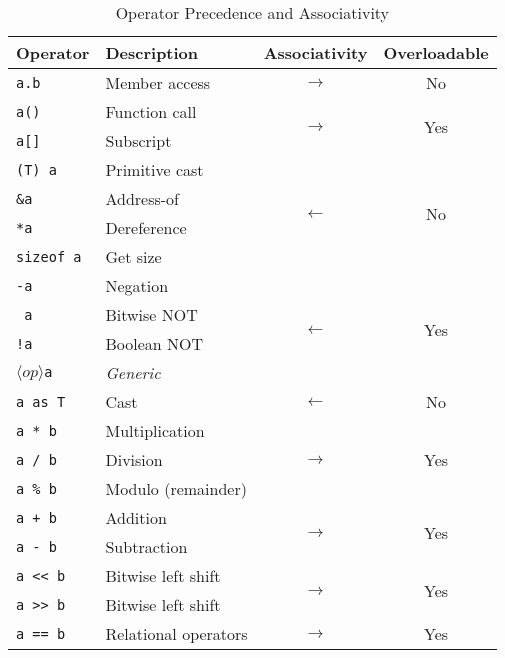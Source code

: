 \begin{table}[h]
    \centering
    \caption{Operator Precedence and Associativity}
    \begin{tabular}{|l|l|c|c|}
        \hline
        \textbf{Operator} & \textbf{Description} & \textbf{Associativity} & \textbf{Overloadable} \\
        \hline
        \texttt{a.b} & Member access & \(\longrightarrow\) & No \\
        \hline
        \texttt{a()} & Function call & \multirow{2}{*}{\(\longrightarrow\)} & \multirow{2}{*}{Yes} \\
        \texttt{a[]} & Subscript & & \\
        \hline
        \texttt{(T) a} & Primitive cast & \multirow{4}{*}{\(\longleftarrow\)} & \multirow{4}{*}{No} \\
        \texttt{\&a} & Address-of & & \\
        \texttt{*a} & Dereference & & \\
        \texttt{sizeof a} & Get size & & \\
        \hline
        \texttt{-a} & Negation & \multirow{4}{*}{\(\longleftarrow\)} & \multirow{4}{*}{Yes} \\
        \texttt{~a} & Bitwise NOT & & \\
        \texttt{!a} & Boolean NOT & & \\
        \(\langle op \rangle\)\texttt{a} & \textit{Generic} & & \\
        \hline
        \texttt{a as T} & Cast & \(\longleftarrow\) & No \\
        \hline
        \texttt{a * b} & Multiplication & \multirow{3}{*}{\(\longrightarrow\)} & \multirow{3}{*}{Yes} \\
        \texttt{a / b} & Division & & \\
        \texttt{a \% b} & Modulo (remainder) & & \\
        \hline
        \texttt{a + b} & Addition & \multirow{2}{*}{\(\longrightarrow\)} & \multirow{2}{*}{Yes} \\
        \texttt{a - b} & Subtraction & & \\
        \hline
        \texttt{a << b} & Bitwise left shift & \multirow{2}{*}{\(\longrightarrow\)} & \multirow{2}{*}{Yes} \\
        \texttt{a >> b} & Bitwise left shift & & \\
        \hline
        \texttt{a == b} & \multirow{6}{*}{Relational operators} & \multirow{6}{*}{\(\longrightarrow\)} & \multirow{6}{*}{Yes} \\

\end{tabular}
\end{table}
